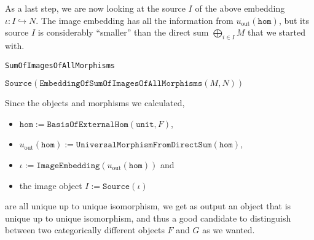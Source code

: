 As a last step, we are now looking at the source $I$ of the above embedding $\iota : I \hookrightarrow N$. The image
embedding has all the information from $u_{\text{out}}(\mathtt{hom})$, but its source $I$ is considerably ``smaller'' than the
direct sum $\bigoplus_{i\in I} M$ that we started with. 

\begin{algorithm}[H]\capstart
    \caption{\texttt{SumOfImagesOfAllMorphisms}}\label{algo:SumOfImagesOfAllMorphisms}
	\BlankLine
	\Return $\mathtt{Source}( \mathtt{EmbeddingOfSumOfImagesOfAllMorphisms}( M, N ) )$\;
\end{algorithm}

Since the objects and morphisms we calculated,
\begin{itemize}
\item $\mathtt{hom} := \mathtt{BasisOfExternalHom}(\mathtt{unit},F)$,
\item $u_{\text{out}}(\mathtt{hom}) := \mathtt{UniversalMorphismFromDirectSum}(\mathtt{hom})$,
\item $\iota := \mathtt{ImageEmbedding}(u_{\text{out}}(\mathtt{hom}))$ and
\item the image object $I := \mathtt{Source}(\iota)$
\end{itemize}
are all unique up to unique isomorphism, we get as output an object that is unique up to unique isomorphism, and thus a good candidate to distinguish
between two categorically different objects $F$ and $G$ as we wanted.

